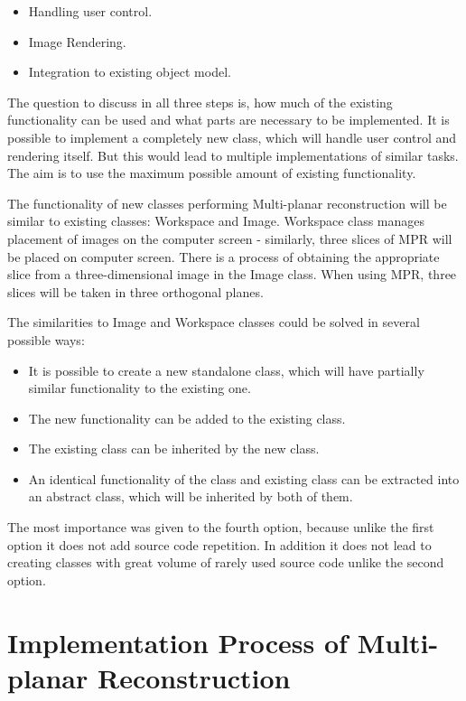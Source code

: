 \begin{itemize}
\item Handling user control.
\item Image Rendering.
\item Integration to existing object model. 
\end{itemize}

The question to discuss in all three steps is, how much of the existing functionality can be used and what parts are necessary to be implemented. It is possible to implement a completely new class, which will handle user control and rendering itself. But this would lead to multiple implementations of similar tasks. The aim is to use the maximum possible amount of existing functionality.

The functionality of new classes performing Multi-planar reconstruction will be similar to existing classes: Workspace and Image. Workspace class manages placement of images on the computer screen - similarly, three slices of MPR will be placed on computer screen. There is a process of obtaining the appropriate slice from a three-dimensional image in the Image class. When using MPR, three slices will be taken in three orthogonal planes.

The similarities to Image and Workspace classes could be solved in several possible ways:

\begin{itemize}
\item It is possible to create a new standalone class, which will have partially similar functionality to the existing one.
\item The new functionality can be added to the existing class.
\item The existing class can be inherited by the new class.
\item An identical functionality of the class and existing class can be extracted into an abstract class, which will be inherited by both of them.
\end{itemize}

The most importance was given to the fourth option, because unlike the first option it does not add source code repetition. In addition it does not lead to creating classes with great volume of rarely used source code unlike the second option.

\section{Implementation Process of Multi-planar Reconstruction}


